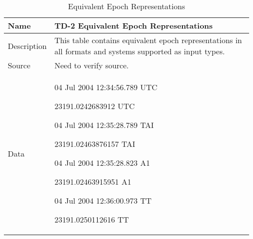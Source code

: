 

\begin{table}[htbp!]
\centering
      \begin{tabular}{|p{1.0 in} |p{5.0 in} |}
         \hline
          \rowcolor[rgb]{0.8,0.8,0.8}  Name & TD-2 Equivalent Epoch Representations\\
         \hline
         Description & This table contains equivalent epoch representations in all formats and systems supported
         as input types.    \\ \hline
         Source &  Need to verify source. \\
         \hline
         Data &
          \begin{compactenum}
              \item 04 Jul 2004 12:34:56.789 UTC
              \item 23191.0242683912 UTC
              \item 04 Jul 2004 12:35:28.789 TAI
              \item 23191.02463876157 TAI
              \item 04 Jul 2004 12:35:28.823 A1
              \item 23191.02463915951 A1
              \item  04 Jul 2004 12:36:00.973 TT
              \item 23191.0250112616 TT
          \end{compactenum}\\
         \hline
\end{tabular}
   \label{Table:TD-2}
   \caption{Equivalent Epoch Representations}
\end{table}

